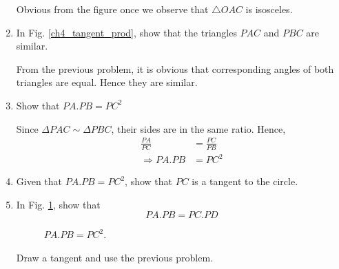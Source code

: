 \begin{enumerate}[label=\arabic*.,ref=\thesubsection.\theenumi]
%
\solution Obvious from the figure once we observe that $\triangle OAC$ is isosceles.
%
%
\item
	In Fig. \ref{ch4_tangent_prod}, show that the triangles $PAC$ and $PBC$ are similar.

\solution From the previous problem, it is obvious that corresponding angles of both triangles are equal.  Hence they are similar.
%
\item
	Show that $PA.PB = PC^2$

\solution Since $\Delta PAC \sim \Delta PBC$, their sides are in the same ratio.  Hence,
%
\begin{align}
\frac{PA}{PC} &= \frac{PC}{PB} \\
\Rightarrow PA.PB &=PC^2
\end{align}
%
\item
Given that $PA.PB = PC^2$, show that $PC$ is a tangent to the circle.

%
\item
	In Fig. \ref{ch4_chord_tangent_prod}, show that\begin{equation}
	PA.PB = PC.PD
	\end{equation}

%
\begin{figure}[!ht]
	\begin{center}
		
		\resizebox{\columnwidth}{!}{}
	\end{center}
	\caption{$PA.PB = PC^2$.}
	\label{ch4_chord_tangent_prod}	
\end{figure}

\solution Draw a tangent and use the previous problem.
\end{enumerate}
